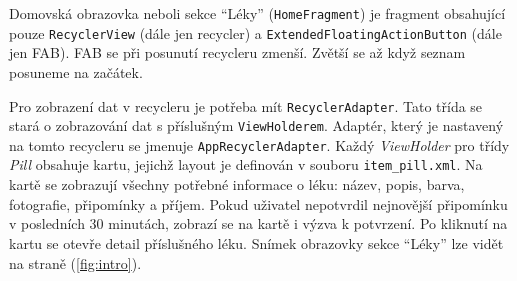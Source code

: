 \documentclass[../TakeYourPill.tex]{subfiles}
\begin{document}
Domovská obrazovka neboli sekce \enquote{Léky} (\texttt{HomeFragment}) je fragment obsahující pouze \texttt{RecyclerView} (dále jen recycler) a \texttt{ExtendedFloatingActionButton} (dále jen FAB). FAB se při posunutí recycleru zmenší. Zvětší se až když seznam posuneme na začátek. 

Pro zobrazení dat v recycleru je potřeba mít \texttt{RecyclerAdapter}. Tato třída se stará o zobrazování dat s příslušným \texttt{ViewHolderem}. Adaptér, který je nastavený na tomto recycleru se jmenuje \texttt{AppRecyclerAdapter}. Každý \emph{ViewHolder} pro třídy \emph{Pill} obsahuje kartu, jejichž layout je definován v souboru \texttt{item\_pill.xml}. Na kartě se zobrazují všechny potřebné informace o léku: název, popis, barva, fotografie, připomínky a příjem. Pokud uživatel nepotvrdil nejnovější připomínku v posledních 30 minutách, zobrazí se na kartě i výzva k potvrzení. Po kliknutí na kartu se otevře detail příslušného léku. Snímek obrazovky sekce \enquote{Léky} lze vidět na straně \pageref{fig:intro} (\ref{fig:intro}).



\end{document}
